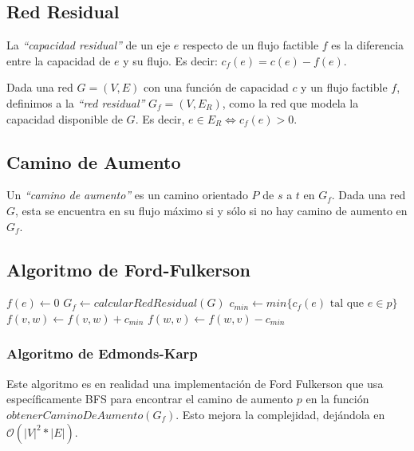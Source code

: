 
\subsection{Red Residual}

La \emph{``capacidad residual''} de un eje $e$ respecto de un flujo factible $f$ es la diferencia entre la capacidad de $e$ y su flujo. Es decir: $c_f(e) = c(e) - f(e)$.

Dada una red $G = (V, E)$ con una funci\'on de capacidad $c$ y un flujo factible $f$, definimos a la \emph{``red residual''} $G_f = (V, E_{R})$, como la red que modela la capacidad disponible de $G$. Es decir, $e \in E_{R} \Longleftrightarrow c_f(e) > 0$. 

\subsection{Camino de Aumento}

Un \emph{``camino de aumento''} es un camino orientado $P$ de $s$ a $t$ en $G_f$. Dada una red $G$, esta se encuentra en su flujo m\'aximo si y s\'olo si no hay camino de aumento en $G_f$.

\subsection{Algoritmo de Ford-Fulkerson}

\begin{algorithm}
\begin{algorithmic}[1]
    \State $f(e) \gets 0$
  \EndFor
  \State $G_f \gets calcularRedResidual(G)$
    \State $c_{min} \gets min\{c_f(e) \textrm{ tal que } e \in p\}$
        \State $f(v,w) \gets f(v,w) + c_{min}$
        \State $f(w,v) \gets f(w,v) - c_{min}$ 
    \EndFor
  \EndWhile
\EndFunction
\end{algorithmic}
\end{algorithm}

\subsubsection{Algoritmo de Edmonds-Karp}

Este algoritmo es en realidad una implementaci\'on de Ford Fulkerson que usa espec\'ificamente BFS para encontrar el camino de aumento $p$ en la funci\'on $obtenerCaminoDeAumento(G_f)$. Esto mejora la complejidad, dej\'andola en $\mathcal{O}(|V|^2 * |E|)$.
